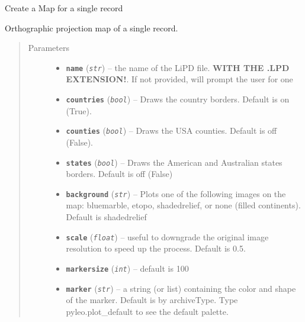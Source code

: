 \documentclass[letterpaper,10pt,english]{sphinxmanual}
\begin{document}

\begin{fulllineitems}
\label{Main:pyleoclim.mapLipd}
Create a Map for a single record

Orthographic projection map of a single record.
\begin{quote}\begin{description}
\item[{Parameters}] \leavevmode\begin{itemize}
\item {} 
\textbf{\texttt{name}} (\emph{\texttt{str}}) -- the name of the LiPD file. \textbf{WITH THE .LPD EXTENSION!}.
If not provided, will prompt the user for one

\item {} 
\textbf{\texttt{countries}} (\emph{\texttt{bool}}) -- Draws the country borders. Default is on (True).

\item {} 
\textbf{\texttt{counties}} (\emph{\texttt{bool}}) -- Draws the USA counties. Default is off (False).

\item {} 
\textbf{\texttt{states}} (\emph{\texttt{bool}}) -- Draws the American and Australian states borders.
Default is off (False)

\item {} 
\textbf{\texttt{background}} (\emph{\texttt{str}}) -- Plots one of the following images on the map:
bluemarble, etopo, shadedrelief, or none (filled continents).
Default is shadedrelief

\item {} 
\textbf{\texttt{scale}} (\emph{\texttt{float}}) -- useful to downgrade the original image resolution to
speed up the process. Default is 0.5.

\item {} 
\textbf{\texttt{markersize}} (\emph{\texttt{int}}) -- default is 100

\item {} 
\textbf{\texttt{marker}} (\emph{\texttt{str}}) -- a string (or list) containing the color and shape of the
marker. Default is by archiveType. Type pyleo.plot\_default to see
the default palette.


\end{itemize}
\end{description}
\end{quote}
\end{fulllineitems}
\end{document}
